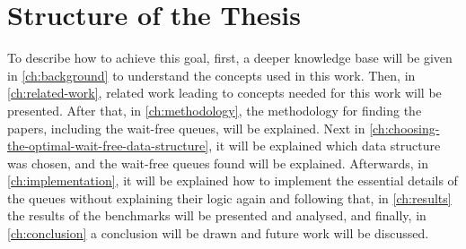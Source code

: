 \section{Structure of the Thesis}\label{sec:structure-of-the-thesis}
To describe how to achieve this goal, first, a deeper knowledge base will be given in \cref{ch:background} to understand the concepts used in this work. Then, in \cref{ch:related-work}, related work leading to concepts needed for this work will be presented. After that, in \cref{ch:methodology}, the methodology for finding the papers, including the wait-free queues, will be explained. Next in \cref{ch:choosing-the-optimal-wait-free-data-structure}, it will be explained which data structure was chosen, and the wait-free queues found will be explained. Afterwards, in \cref{ch:implementation}, it will be explained how to implement the essential details of the queues without explaining their logic again and following that, in \cref{ch:results} the results of the benchmarks will be presented and analysed, and finally, in \cref{ch:conclusion} a conclusion will be drawn and future work will be discussed.
